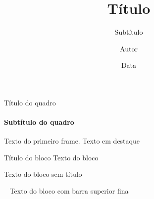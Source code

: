 \documentclass[aspectratio=169]{beamer}
\title{Título}
\subtitle{Subtítulo}
\author[A.]{Autor}
\institute[Inst.]{Instituição \\ email, site, etc.}
\date{Data}   			 %
\begin{document}
\begin{frame}
	\titlepage
\end{frame}

\begin{frame}{Título do quadro}
	\framesubtitle{Subtítulo do quadro}
	Texto do primeiro frame.
	\alert{Texto em destaque}    \pause
	
	\begin{block}{Título do bloco}
		Texto do bloco
	\end{block}     \pause
	
	\begin{block}{}
		Texto do bloco sem título
	\end{block}     \pause
	
	\begin{block}{\ }
		Texto do bloco com barra superior fina
	\end{block}
\end{frame}
\end{document}
